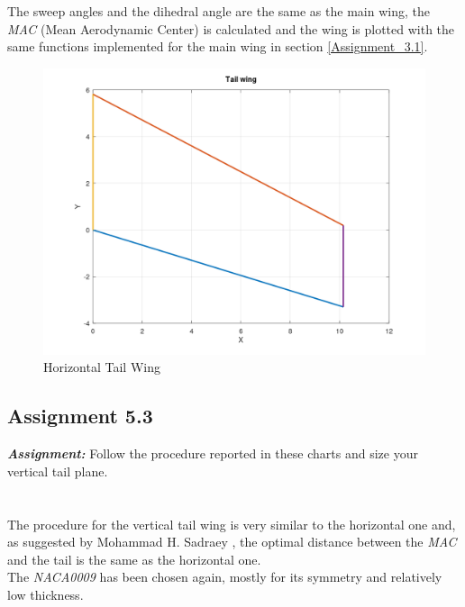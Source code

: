\documentclass{article}
\begin{document}
\clearpage

The sweep angles and the dihedral angle are the same as the main wing, the \textit{MAC} (Mean Aerodynamic Center) is calculated
and the wing is plotted with the same functions implemented for the main wing in section \ref{Assignment_3.1}.

\begin{figure}[h!]
    \centering
    \includegraphics[width=\textwidth]{Sources/Plots_and_Pictures/Tail_Wing.png}
    \caption{Horizontal Tail Wing}
    \label{Horizontal_tail}
\end{figure}


\clearpage

\subsection{Assignment 5.3\label{Assignment_5.3}}

\textbf{\textit{Assignment:}} Follow the procedure reported in these charts
 and size your vertical tail plane. \\ \\ \\ 

The procedure for the vertical tail wing is very similar to the horizontal one and, as suggested by 
Mohammad H. Sadraey \autocite{Sadraey_Mohammad}, the optimal distance between the \textit{MAC} and the tail
is the same as the horizontal one.\\ 

The \textit{NACA0009} \autocite{Airfoiltools} has been chosen again, mostly for its symmetry and relatively
low thickness.\\ 
\end{document}
